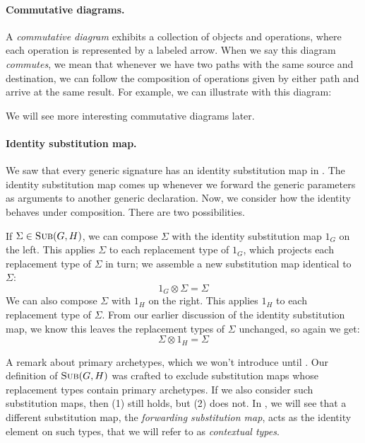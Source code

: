 \documentclass[../generics]{subfiles}
\begin{document}
\paragraph{Commutative diagrams.}
A \emph{commutative diagram} exhibits a collection of objects and operations, where each operation is represented by a labeled arrow. When we say this diagram \emph{commutes}, we mean that whenever we have two paths with the same source and destination, we can follow the composition of operations given by either path and arrive at the same result. For example, we can illustrate  with this diagram:
\begin{center}
\end{center}
We will see more interesting commutative diagrams later.

\paragraph{Identity substitution map.}
We saw that every generic signature has an identity substitution map in . The identity substitution map comes up whenever we forward the generic parameters as arguments to another generic declaration.  Now, we consider how the identity behaves under composition. There are two possibilities.

If $\Sigma\in\textsc{Sub}({G, H})$, we can compose $\Sigma$ with the identity substitution map $1_G$ on the left. This applies $\Sigma$ to each replacement type of $1_G$, which projects each replacement type of $\Sigma$ in turn; we assemble a new substitution map identical to $\Sigma$:
\[
1_G \otimes \Sigma = \Sigma\tag{1}
\]
We can also compose $\Sigma$ with $1_H$ on the right. This applies $1_H$ to each replacement type of $\Sigma$. From our earlier discussion of the identity substitution map, we know this leaves the replacement types of $\Sigma$ unchanged, so again we get:
\[
\Sigma\otimes 1_H = \Sigma\tag{1}
\]

A remark about primary archetypes, which we won't introduce until . Our definition of $\textsc{Sub}({G, H})$ was crafted to exclude substitution maps whose replacement types contain primary archetypes. If we also consider such substitution maps, then (1) still holds, but (2) does not. In , we will see that a different substitution map, the \emph{forwarding substitution map}, acts as the identity element on such types, that we will refer to as \emph{contextual types}.
\end{document}
